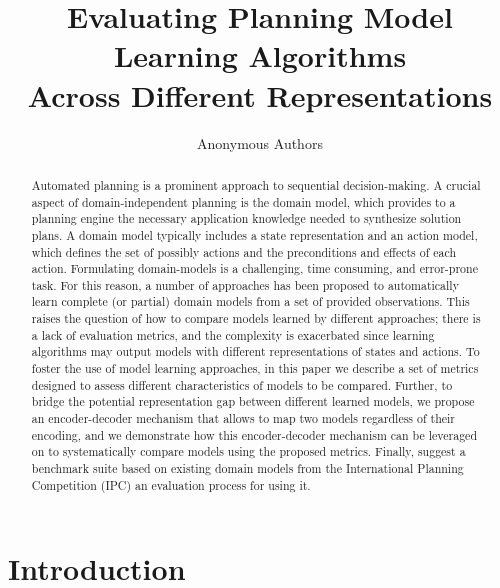 \documentclass{article}
\title{Evaluating Planning Model Learning Algorithms \\ Across Different Representations}
\author{Anonymous Authors}
\theoremstyle{definition}
\theoremstyle{remark}
\begin{document}
\maketitle

\begin{abstract}
Automated planning is a prominent approach to sequential decision-making. A crucial aspect of domain-independent planning is the domain model, which provides to a planning engine the necessary application knowledge needed to synthesize solution plans. A domain model typically includes a state representation and an action model, which defines the set of possibly actions and the preconditions and effects of each action. 
Formulating domain-models is a challenging, time consuming, and error-prone task. For this reason, a number of approaches has been proposed to automatically learn complete (or partial) domain models from a set of provided observations. This raises the question of how to compare models learned by different approaches; there is a lack of evaluation metrics, and the complexity is exacerbated since learning algorithms may output models with different representations of states and actions. 
To foster the use of model learning approaches, in this paper we describe a set of metrics designed to assess different characteristics of models to be compared. Further, to bridge the potential representation gap between different learned models, we propose an encoder-decoder mechanism that allows to map two models regardless of their encoding, and we demonstrate how this encoder-decoder mechanism can be leveraged on to systematically compare models using the proposed metrics. Finally, suggest a benchmark suite based on existing domain models from the International Planning Competition (IPC) an evaluation process for using it. 
\end{abstract}

\section{Introduction}
\end{document}
